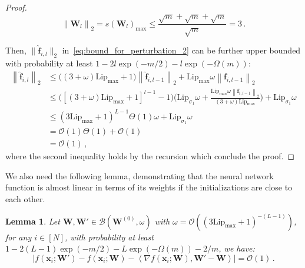 \documentclass[nohyperref]{article}
\theoremstyle{plain}
\newtheorem{lemma}{Lemma}
\theoremstyle{definition}
\theoremstyle{remark}
\begin{document}
\begin{proof}
\begin{equation*}
\left \| \bm{W}_l\right \| _2 = s(\bm{W}_l)_{\max} \leq \frac{\sqrt{m} + \sqrt{m} +\sqrt{m}}{\sqrt{m}} = 3\,.
\end{equation*}

Then, $\|\hat{\bm{f}}_{i,l}\|_2$ in~\cref{eq:bound_for_perturbation_2} can be further upper bounded with probability at least $1-2l\exp(-m/2)-l\exp(-\Omega (m))$:
\begin{equation*}
\begin{split}
\left \| \hat{\bm{f}}_{i,l} \right \| _2 & \leq \bigg((3 + \omega) \mathrm{Lip}_{\max}+1\bigg) \left \| \hat{\bm{f}}_{i,l-1}\right \|_2+ \mathrm{Lip}_{\max} \omega \left \| \bm{f}_{i,l-1}\right \| _2\\
& \leq \bigg([(3 + \omega) \mathrm{Lip}_{\max}+1]^{l-1}-1\bigg)\bigg(\mathrm{Lip}_{\sigma_{1}}\omega + \frac{\mathrm{Lip}_{\max}\omega \left \| \bm{f}_{i,l-1}\right \| _2}{(3+\omega)\mathrm{Lip}_{\max}}\bigg)+\mathrm{Lip}_{\sigma_1}\omega \\
& \leq (3\mathrm{Lip}_{\max}+1)^{L-1}\Theta (1)\omega+\mathrm{Lip}_{\sigma_1}\omega\\
& = \mathcal{O}(1)\Theta (1)+ \mathcal{O}(1)\\
& = \mathcal{O}(1)\,,
\end{split}
\end{equation*}
where the second inequality holds by the recursion which conclude the proof.

\end{proof}

We also need the following lemma, demonstrating that the neural network function is almost linear in terms of its weights if the initializations are close to each other.
\begin{lemma}
\label{lemma:lemma_4.1_in_GuQuanquan}
Let $\bm{W}, \bm{W}' \in \mathcal{B} (\bm{W}^{(0)},\omega )$  with $\omega = \mathcal{O}((3\mathrm{Lip}_{\max}+1)^{-(L-1)})$, for any $i \in [N]$,
with probability at least $1-2(L-1)\exp(-m/2)-L\exp(-\Omega (m))-2/m$, we have:
\begin{equation*}
\left | f(\bm {x}_i;\bm{W}') - f(\bm {x}_i;\bm{W}) - \left \langle \nabla  f(\bm {x}_i;\bm{W}), \bm{W}' -\bm{W}  \right \rangle \right | = \mathcal{O}(1)\,.
\end{equation*}
\end{lemma}
\end{document}
